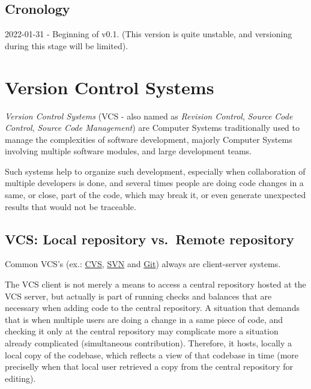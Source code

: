 \documentclass[
]{book}
\begin{document}
\hypertarget{cronology}{%
\section{Cronology}\label{cronology}}

2022-01-31 - Beginning of v0.1. (This version is quite unstable, and versioning
during this stage will be limited).

\hypertarget{version-control-systems}{%
\chapter{Version Control Systems}\label{version-control-systems}}

\emph{Version Control Systems} \citet{wiki_version_control} (VCS - also named as \emph{Revision Control},
\emph{Source Code Control}, \emph{Source Code Management}) are Computer Systems
traditionally used to manage the complexities of software development, majorly
Computer Systems involving multiple software modules, and large development teams.

Such systems help to organize such development, especially when collaboration of
multiple developers is done, and several times people are doing code changes in a same, or close,
part of the code, which may break it, or even generate unexpected results that would not be traceable.

\hypertarget{vcs-local-repository-vs.-remote-repository}{%
\section{VCS: Local repository vs.~Remote repository}\label{vcs-local-repository-vs.-remote-repository}}

Common VCS's (ex.: \href{https://en.wikipedia.org/wiki/Concurrent_Versions_System}{CVS},
\href{https://en.wikipedia.org/wiki/Concurrent_Versions_System}{SVN} and
\href{https://en.wikipedia.org/wiki/Git}{Git}) always are client-server systems.

The VCS client is not merely a means to access a central repository hosted
at the VCS server, but actually is part of running checks and balances that are
necessary when adding code to the central repository. A situation that demands that
is when multiple users are doing a change in a same piece of code, and checking
it only at the central repository may complicate more a situation already
complicated (simultaneous contribution). Therefore, it hosts, locally
a local copy of the codebase, which reflects a view of that codebase in time
(more preciselly when that local user retrieved a copy from the central repository
for editing).
\end{document}
